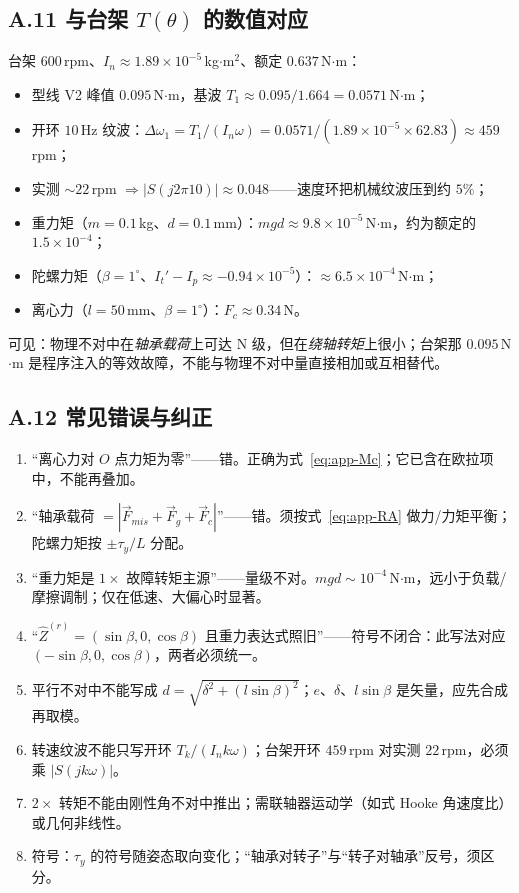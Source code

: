 \subsection*{A.11 与台架 $T(\theta)$ 的数值对应}

台架 $600$\,rpm、$I_n\approx1.89\times10^{-5}$\,kg$\cdot$m$^2$、额定 $0.637$\,N$\cdot$m：

\begin{itemize}
  \item 型线 V2 峰值 $0.095$\,N$\cdot$m，基波 $T_1\approx0.095/1.664=0.0571$\,N$\cdot$m；
  \item 开环 $10$\,Hz 纹波：$\Delta\omega_1=T_1/(I_n\omega)=0.0571/(1.89\times10^{-5}\times62.83)\approx459$\,rpm；
  \item 实测 $\sim22$\,rpm $\Rightarrow |S(j2\pi10)|\approx0.048$——速度环把机械纹波压到约 $5\%$；
  \item 重力矩（$m=0.1$\,kg、$d=0.1$\,mm）：$mgd\approx9.8\times10^{-5}$\,N$\cdot$m，约为额定的 $1.5\times10^{-4}$；
  \item 陀螺力矩（$\beta=1^\circ$、$I_t'-I_p\approx-0.94\times10^{-5}$）：$\approx6.5\times10^{-4}$\,N$\cdot$m；
  \item 离心力（$l=50$\,mm、$\beta=1^\circ$）：$F_c\approx0.34$\,N。
\end{itemize}

可见：物理不对中在\emph{轴承载荷}上可达 N 级，但在\emph{绕轴转矩}上很小；台架那 $0.095$\,N$\cdot$m 是程序注入的等效故障，不能与物理不对中量直接相加或互相替代。

\subsection*{A.12 常见错误与纠正}

\begin{enumerate}
  \item “离心力对 $O$ 点力矩为零”——错。正确为式~\eqref{eq:app-Mc}；它已含在欧拉项中，不能再叠加。
  \item “轴承载荷 $=|\vec F_{mis}+\vec F_g+\vec F_c|$”——错。须按式~\eqref{eq:app-RA} 做力/力矩平衡；陀螺力矩按 $\pm\tau_y/L$ 分配。
  \item “重力矩是 $1\times$ 故障转矩主源”——量级不对。$mgd\sim10^{-4}$\,N$\cdot$m，远小于负载/摩擦调制；仅在低速、大偏心时显著。
  \item “$\hat Z^{(r)}=(\sin\beta,0,\cos\beta)$ 且重力表达式照旧”——符号不闭合：此写法对应 $(-\sin\beta,0,\cos\beta)$，两者必须统一。
  \item 平行不对中不能写成 $d=\sqrt{\delta^2+(l\sin\beta)^2}$；$e$、$\delta$、$l\sin\beta$ 是矢量，应先合成再取模。
  \item 转速纹波不能只写开环 $T_k/(I_nk\omega)$；台架开环 $459$\,rpm 对实测 $22$\,rpm，必须乘 $|S(jk\omega)|$。
  \item $2\times$ 转矩不能由刚性角不对中推出；需联轴器运动学（如式 Hooke 角速度比）或几何非线性。
  \item 符号：$\tau_y$ 的符号随姿态取向变化；“轴承对转子”与“转子对轴承”反号，须区分。
\end{enumerate}

